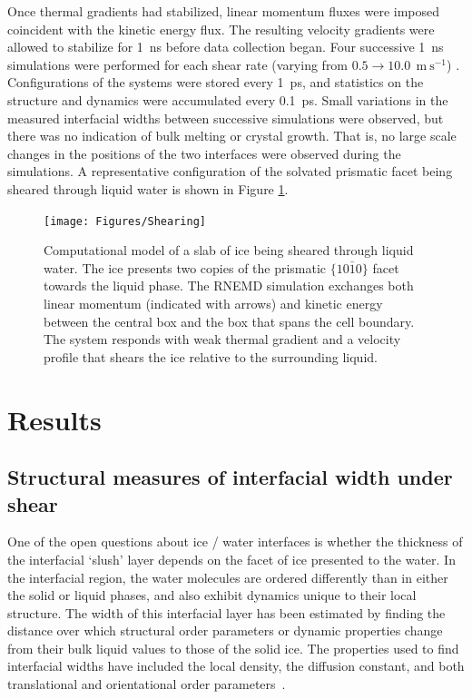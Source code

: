 Once thermal gradients had stabilized, linear momentum fluxes were
imposed coincident with the kinetic energy flux. The resulting
velocity gradients were allowed to stabilize for 1~ns before data
collection began. Four successive 1~ns simulations were performed for
each shear rate (varying from
$0.5 \rightarrow 10.0~\mathrm{~m~s}^{-1}$) . Configurations of the
systems were stored every 1~ps, and statistics on the structure and
dynamics were accumulated every 0.1~ps. Small variations in the
measured interfacial widths between successive simulations were
observed, but there was no indication of bulk melting or crystal
growth. That is, no large scale changes in the positions of the two
interfaces were observed during the simulations. A representative
configuration of the solvated prismatic facet being sheared through
liquid water is shown in Figure \ref{fig:Shearing}.

\begin{figure}
\texttt{[image: Figures/Shearing]}
\caption{\label{fig:Shearing} Computational model of a slab of ice
  being sheared through liquid water.  The ice presents two copies of
  the prismatic $\{10\bar{1}0\}$ facet towards the liquid phase.  The
  RNEMD simulation exchanges both linear momentum (indicated with
  arrows) and kinetic energy between the central box and the box that
  spans the cell boundary.  The system responds with weak thermal
  gradient and a velocity profile that shears the ice relative to the
  surrounding liquid.}
\end{figure}

\section{Results}

\subsection{Structural measures of interfacial width under shear}\label{structure}
One of the open questions about ice / water interfaces is whether the
thickness of the interfacial `slush' layer depends on the facet
of ice presented to the water. In the interfacial region, the water
molecules are ordered differently than in either the solid or liquid
phases, and also exhibit dynamics unique to their local structure.
The width of this interfacial layer has been estimated by finding the
distance over which structural order parameters or dynamic properties
change from their bulk liquid values to those of the solid ice. The
properties used to find interfacial widths have included the local
density, the diffusion constant, and both translational and
orientational order
parameters~\cite{Karim1988,Karim1990,Hayward2001,Hayward2002,Bryk2002,Gay2002,Louden2013a}.

